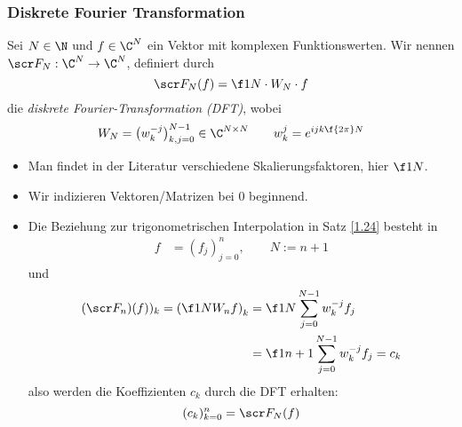 \documentclass[a4paper,11pt]{scrartcl}
\begin{document}
\subsubsection{Diskrete Fourier Transformation}

\begin{df} \label{1.26}
	Sei $N\in \N$ und $f\in \C^N$ ein Vektor mit komplexen Funktionswerten.
	Wir nennen $\scr F_N: \C^N \to \C^N$, definiert durch
	\[
		\scr F_N(f) = \f 1N \cdot W_N \cdot f
	\]
	die \emph{diskrete Fourier-Transformation (DFT)}, wobei
	\[
		W_N = \big(w_{k}^{-j}\big)_{k,j=0}^{N-1} \in \C^{N\times N} \qquad w_{k}^j = e^{ijk \f {2\pi}N}
	\]
	\begin{note}
		\begin{itemize}
			\item
				Man findet in der Literatur verschiedene Skalierungsfaktoren, hier $\f 1N$.
			\item
				Wir indizieren Vektoren/Matrizen bei $0$ beginnend.		
			\item
				Die Beziehung zur trigonometrischen Interpolation in Satz \ref{1.24} besteht in
				\begin{align*}
					f &= (f_j)_{j=0}^n, \qquad N:= n+1
				\end{align*}
				und
				\begin{align*}
					(\scr F_n)(f))_k = \left( \f 1N W_n f\right)_k &= \f 1N \sum_{j=0}^{N-1}w_k^{-j} f_j \\
					&= \f 1{n+1} \sum_{j=0}^{N-1}w_k^{-j} f_j = c_k
				\end{align*}
				also werden die Koeffizienten $c_k$ durch die DFT erhalten:
				\[
					(c_k)_{k=0}^n = \scr F_N(f)
				\]
		\end{itemize}
	\end{note}
\end{df}
\end{document}
